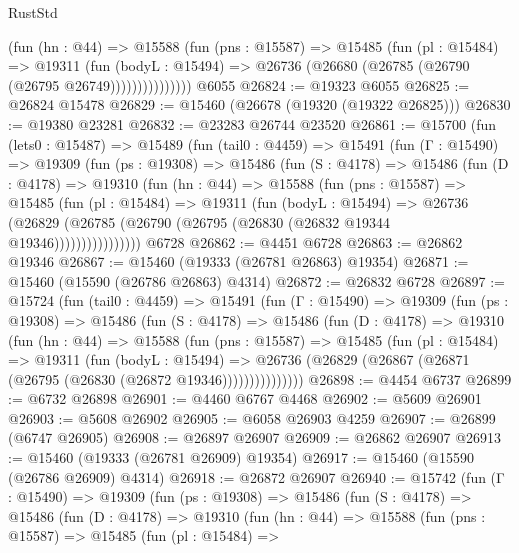 \begin{lexlean}{RustStd}
\begin{coremodule}
                  (fun (hn : @44) =>
                  @15588
                    (fun (pns : @15587) =>
                    @15485
                      (fun (pl : @15484) =>
                      @19311
                        (fun (bodyL : @15494) =>
                        @26736 (@26680 (@26785 (@26790 (@26795 @26749)))))))))))))))
    @6055
@26824 := @19323 @6055
@26825 := @26824 @15478
@26829 := @15460 (@26678 (@19320 (@19322 @26825)))
@26830 := @19380 @23281
@26832 := @23283 @26744 @23520
@26861 := @15700
    (fun (lets0 : @15487) =>
    @15489
      (fun (tail0 : @4459) =>
      @15491
        (fun (Γ : @15490) =>
        @19309
          (fun (ps : @19308) =>
          @15486
            (fun (S : @4178) =>
            @15486
              (fun (D : @4178) =>
              @19310
                (fun (hn : @44) =>
                @15588
                  (fun (pns : @15587) =>
                  @15485
                    (fun (pl : @15484) =>
                    @19311
                      (fun (bodyL : @15494) =>
                      @26736
                        (@26829
                          (@26785 (@26790 (@26795 (@26830 (@26832 @19344 @19346))))))))))))))))
    @6728
@26862 := @4451 @6728
@26863 := @26862 @19346
@26867 := @15460 (@19333 (@26781 @26863) @19354)
@26871 := @15460 (@15590 (@26786 @26863) @4314)
@26872 := @26832 @6728
@26897 := @15724
    (fun (tail0 : @4459) =>
    @15491
      (fun (Γ : @15490) =>
      @19309
        (fun (ps : @19308) =>
        @15486
          (fun (S : @4178) =>
          @15486
            (fun (D : @4178) =>
            @19310
              (fun (hn : @44) =>
              @15588
                (fun (pns : @15587) =>
                @15485
                  (fun (pl : @15484) =>
                  @19311
                    (fun (bodyL : @15494) =>
                    @26736 (@26829 (@26867 (@26871 (@26795 (@26830 (@26872 @19346)))))))))))))))
@26898 := @4454 @6737
@26899 := @6732 @26898
@26901 := @4460 @6767 @4468
@26902 := @5609 @26901
@26903 := @5608 @26902
@26905 := @6058 @26903 @4259
@26907 := @26899 (@6747 @26905)
@26908 := @26897 @26907
@26909 := @26862 @26907
@26913 := @15460 (@19333 (@26781 @26909) @19354)
@26917 := @15460 (@15590 (@26786 @26909) @4314)
@26918 := @26872 @26907
@26940 := @15742
    (fun (Γ : @15490) =>
    @19309
      (fun (ps : @19308) =>
      @15486
        (fun (S : @4178) =>
        @15486
          (fun (D : @4178) =>
          @19310
            (fun (hn : @44) =>
            @15588
              (fun (pns : @15587) =>
              @15485
                (fun (pl : @15484) =>

\end{coremodule}
\end{lexlean}
